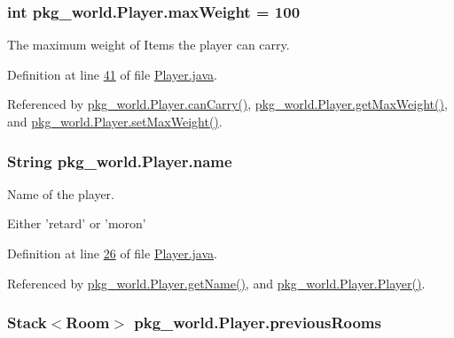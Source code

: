 \hypertarget{classpkg__world_1_1Player_a780685c88ad92ca6b280cf841ab33728}{
\subsubsection[{max\-Weight}]{\setlength{\rightskip}{0pt plus 5cm}int pkg\-\_\-world.\-Player.\-max\-Weight = 100\hspace{0.3cm}{\ttfamily [private]}}}\label{classpkg__world_1_1Player_a780685c88ad92ca6b280cf841ab33728}


The maximum weight of Items the player can carry. 



Definition at line \hyperlink{Player_8java_source_l00041}{41} of file \hyperlink{Player_8java_source}{Player.\-java}.



Referenced by \hyperlink{Player_8java_source_l00188}{pkg\-\_\-world.\-Player.\-can\-Carry()}, \hyperlink{Player_8java_source_l00083}{pkg\-\_\-world.\-Player.\-get\-Max\-Weight()}, and \hyperlink{Player_8java_source_l00091}{pkg\-\_\-world.\-Player.\-set\-Max\-Weight()}.

\hypertarget{classpkg__world_1_1Player_ab4c41ebebb7fcc55fa253e48af0c4267}{
\subsubsection[{name}]{\setlength{\rightskip}{0pt plus 5cm}String pkg\-\_\-world.\-Player.\-name\hspace{0.3cm}{\ttfamily [private]}}}\label{classpkg__world_1_1Player_ab4c41ebebb7fcc55fa253e48af0c4267}


Name of the player. 

Either 'retard' or 'moron' 

Definition at line \hyperlink{Player_8java_source_l00026}{26} of file \hyperlink{Player_8java_source}{Player.\-java}.



Referenced by \hyperlink{Player_8java_source_l00075}{pkg\-\_\-world.\-Player.\-get\-Name()}, and \hyperlink{Player_8java_source_l00063}{pkg\-\_\-world.\-Player.\-Player()}.

\hypertarget{classpkg__world_1_1Player_a28f9bc6a3c1d829996e8a38935b77fd1}{
\subsubsection[{previous\-Rooms}]{\setlength{\rightskip}{0pt plus 5cm}Stack$<${\bf Room}$>$ pkg\-\_\-world.\-Player.\-previous\-Rooms\hspace{0.3cm}{\ttfamily [private]}}}\label{classpkg__world_1_1Player_a28f9bc6a3c1d829996e8a38935b77fd1}


